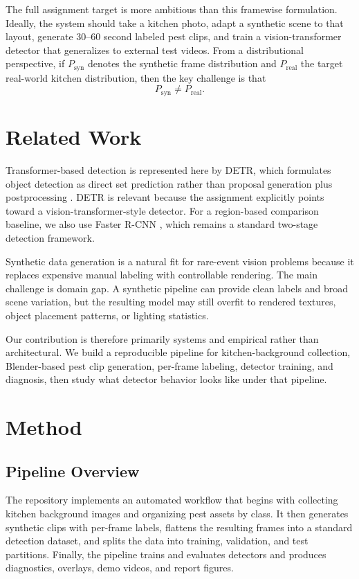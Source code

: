 \documentclass[11pt]{article}
\begin{document}
The full assignment target is more ambitious than this framewise formulation. Ideally, the system should take a kitchen photo, adapt a synthetic scene to that layout, generate 30--60 second labeled pest clips, and train a vision-transformer detector that generalizes to external test videos. From a distributional perspective, if $P_{\mathrm{syn}}$ denotes the synthetic frame distribution and $P_{\mathrm{real}}$ the target real-world kitchen distribution, then the key challenge is that
\[
P_{\mathrm{syn}} \neq P_{\mathrm{real}}.
\]

\section{Related Work}
Transformer-based detection is represented here by DETR, which formulates object detection as direct set prediction rather than proposal generation plus postprocessing \cite{carion2020detr}. DETR is relevant because the assignment explicitly points toward a vision-transformer-style detector. For a region-based comparison baseline, we also use Faster R-CNN \cite{ren2015fasterrcnn}, which remains a standard two-stage detection framework.

Synthetic data generation is a natural fit for rare-event vision problems because it replaces expensive manual labeling with controllable rendering. The main challenge is domain gap. A synthetic pipeline can provide clean labels and broad scene variation, but the resulting model may still overfit to rendered textures, object placement patterns, or lighting statistics.

Our contribution is therefore primarily systems and empirical rather than architectural. We build a reproducible pipeline for kitchen-background collection, Blender-based pest clip generation, per-frame labeling, detector training, and diagnosis, then study what detector behavior looks like under that pipeline.

\section{Method}
\subsection{Pipeline Overview}
The repository implements an automated workflow that begins with collecting kitchen background images and organizing pest assets by class. It then generates synthetic clips with per-frame labels, flattens the resulting frames into a standard detection dataset, and splits the data into training, validation, and test partitions. Finally, the pipeline trains and evaluates detectors and produces diagnostics, overlays, demo videos, and report figures.
\end{document}
